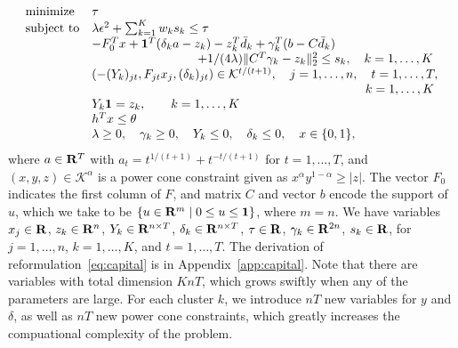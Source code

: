 \documentclass[12pt]{article}
\theoremstyle{thmstyleone}%
\theoremstyle{thmstyletwo}%
\theoremstyle{thmstylethree}%
\begin{document}
\begin{equation}
	\label{eq:capital}
	\begin{array}{ll}
	\text{minimize} & \tau\\
	\text{subject to} & \lambda \epsilon^2 + \sum^{K}_{k=1} w_k s_k \leq \tau\\
	& - F_{0}^Tx + \ones^T(\delta_{k}a - z_{k}) - z_k^T\bar{d}_k + \gamma_k^T(b - C\bar{d}_k) \\
	& \hspace{3cm} +1/(4\lambda)\| C^T\gamma_k - z_k \|^2_2 \leq s_k, \quad k = 1,\dots,K\\
	& \left(-(Y_k)_{jt},F_{jt}x_j,(\delta_k)_{jt}\right) \in  \mathcal{K}^{t/(t+1)}, \quad j = 1,\dots,n, \quad t= 1,\dots,T,\\
	& \hspace{7.4cm} \quad k= 1,\dots,K\\
	& Y_k \ones  = z_{k}, \quad \quad k= 1,\dots,K\\
	&  h^Tx \leq \theta\\
	& \lambda \geq 0, \quad \gamma_k \geq 0, \quad Y_k \leq 0,\quad \delta_{k} \leq 0,  \quad x \in \{0,1\},
	\end{array}
\end{equation}
where $a \in {\mathbf R}^T$ with $a_t = t^{1/(t+1)} + t^{-t/(t+1)}$ for $t = 1,\dots,T$, and $(x,y,z) \in \mathcal{K}^{\alpha}$ is a power cone constraint given as $x^{\alpha} y^{1 - \alpha} \geq |z|$.
The vector $F_0$ indicates the first column of $F$, and matrix $C$ and vector $b$ encode the support of $u$, which we take to be $\{u\in {\mathbf R}^m \mid 0 \leq u \leq \mathbf 1\}$, where $m = n$.
We have variables $x_j \in {\mathbf R}$, $z_k \in {\mathbf R}^{n}$, $Y_{k} \in {\mathbf R}^{n\times T}$, $\delta_{k} \in {\mathbf R}^{n\times T}$, $\tau \in {\mathbf R}$, $\gamma_k \in {\mathbf R}^{2n}$, $s_k \in {\mathbf R}$, for $j = 1,\dots,n$, $k= 1,\dots,K$, and $t= 1,\dots,T$.
The derivation of reformulation~\eqref{eq:capital} is in Appendix~\ref{app:capital}.
Note that there are variables with total dimension $KnT$, which grows swiftly when any of the parameters are large.
For each cluster $k$, we introduce $nT$ new variables for $y$ and $\delta$, as well as $nT$ new power cone constraints, which greatly increases the compuational complexity of the problem.
\end{document}
